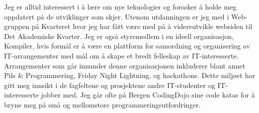 \documentclass[11pt,a4paper,sans]{moderncv} %
\begin{document}
Jeg er alltid interessert i å lære om nye teknologier og forsøker å holde meg oppdatert på de utviklinger som skjer. Utenom utdanningen er jeg med i Web-gruppen på Kvarteret hvor jeg har fått være med på å videreutvikle websiden til Det Akademiske Kvarter. Jeg er også styremedlem i en ideell organisasjon, Kompiler, hvis formål er å være en plattform for samordning og organisering av IT-arrangementer med mål om å skape et bredt felleskap av IT-interesserte. Arrangementer som går innunder denne organisasjonen inkluderer blant annet Pils \& Programmering, Friday Night Lightning, og hackathons. Dette miljøet har gitt meg innsikt i de fagfeltene og prosjektene andre IT-studenter og IT-interesserte jobber med. Jeg går ofte på Bergen CodingDojo sine code katas for å bryne meg på små og mellomstore programmeringsutfordringer.

\makeletterclosing %

\end{document}
